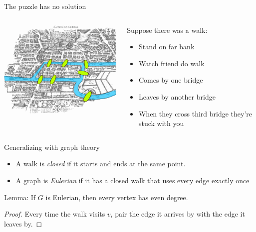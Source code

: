 \documentclass{beamer}
\begin{document}
\begin{frame}{The puzzle has no solution}
  \begin{columns}
    \begin{column}{.5\textwidth}
          \includegraphics[width=\textwidth]{Pictures/Konigsberg_bridges.png}
      \end{column}
    \begin{column}{.5\textwidth}
      \begin{block}{Suppose there was a walk:}
      \begin{itemize}
      \item Stand on far bank
      \item Watch friend do walk
      \item Comes by one bridge
      \item Leaves by another bridge
      \item When they cross third bridge they're stuck with you
      \end{itemize}
\end{block}
      \end{column}
    \end{columns}
 \end{frame}
\begin{frame}{Generalizing with graph theory}
  \begin{definition}
    \begin{itemize}
    \item A walk is \emph{closed} if it starts and ends at the same point.
    \item A graph is \emph{Eulerian} if it has a closed walk that uses every edge exactly once
    \end{itemize}
  \end{definition}

  \begin{block}{Lemma:} If $G$ is Eulerian, then every vertex has even degree.
  \end{block}
  \begin{proof}Every time the walk visits $v$, pair the edge it arrives by with the edge it leaves by.
    \end{proof}
\end{frame}  
\end{document}
